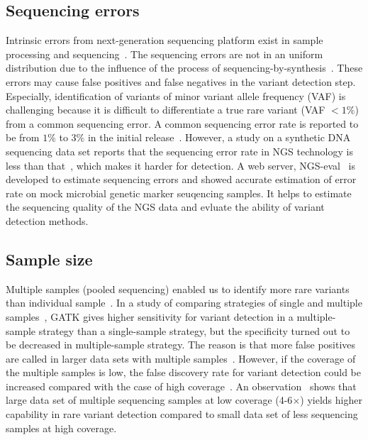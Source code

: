 \documentclass[a4,center,fleqn]{NAR}
\begin{document}
\subsection{Sequencing errors}

Intrinsic errors from next-generation sequencing platform exist in sample processing and sequencing~\citep{Olson2015}.
The sequencing errors are not in an uniform distribution due to the influence of the process of sequencing-by-synthesis~\citep{nakamura2011sequence, mamanova2010target}.
These errors may cause false positives and false negatives in the variant detection step.
Especially, identification of variants of minor variant allele frequency (VAF) is challenging because it is difficult to differentiate a true rare variant (VAF $<1\%$) from a common sequencing error.
A common sequencing error rate is reported to be from $1\%$ to $3\%$ in the initial release~\citep{shendure2008next}.
However, a study on a synthetic DNA sequencing data set reports that the sequencing error rate in NGS technology is less than that~\citep{Flaherty2012}, which makes it harder for detection.
A web server, NGS-eval~\citep{may2015ngs} is developed to estimate sequencing errors and showed accurate estimation of error rate on mock microbial genetic marker seuqencing samples.
It helps to estimate the sequencing quality of the NGS data and evluate the ability of variant detection methods.



\subsection{Sample size}

Multiple samples (pooled sequencing) enabled us to identify more rare variants than individual sample~\citep{Bao2014, liu2012steps}.
In a study of comparing strategies of single and multiple samples~\citep{liu2013variant}, GATK gives higher sensitivity for variant detection in a multiple-sample strategy than a single-sample strategy, but the specificity turned out to be decreased in multiple-sample strategy.
The reason is that more false positives are called in larger data sets with multiple samples~\citep{Nielsen2011}.
However, if the coverage of the multiple samples is low, the false discovery rate for variant detection could be increased compared with the case of high coverage~\citep{Cheng2014}.
An observation~\citep{le2011snp} shows that large data set of multiple sequencing samples at low coverage (4-6$\times$) yields higher capability in rare variant detection compared to small data set of less sequencing samples at high coverage.
\end{document}
